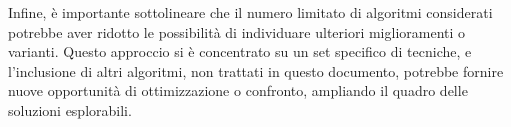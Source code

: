 Infine, è importante sottolineare che il numero limitato di algoritmi 
considerati potrebbe aver ridotto le possibilità di individuare ulteriori 
miglioramenti o varianti. Questo approccio si è concentrato su un set specifico 
di tecniche, e l'inclusione di altri algoritmi, non trattati in questo documento, 
potrebbe fornire nuove opportunità di ottimizzazione o confronto, 
ampliando il quadro delle soluzioni esplorabili.